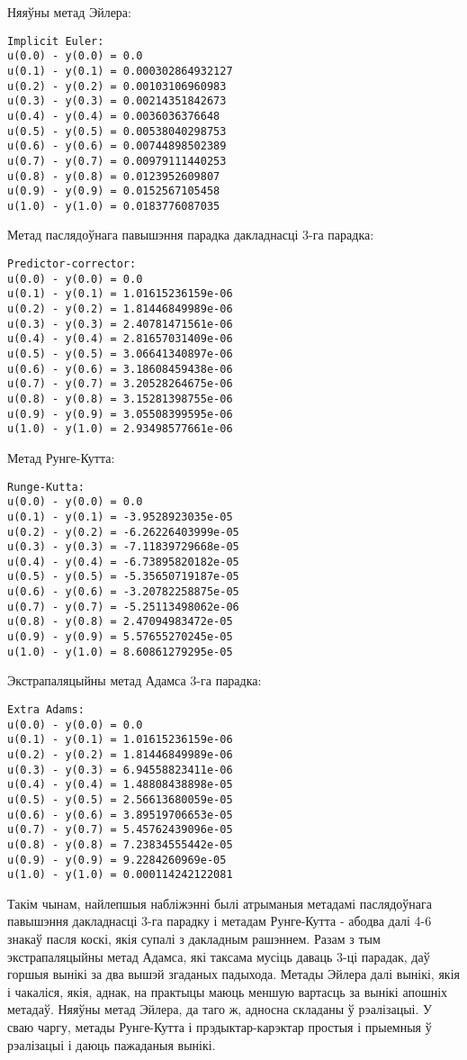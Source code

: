 Няяўны метад Эйлера:
{\small
\begin{verbatim}
Implicit Euler:
u(0.0) - y(0.0) = 0.0
u(0.1) - y(0.1) = 0.000302864932127
u(0.2) - y(0.2) = 0.00103106960983
u(0.3) - y(0.3) = 0.00214351842673
u(0.4) - y(0.4) = 0.0036036376648
u(0.5) - y(0.5) = 0.00538040298753
u(0.6) - y(0.6) = 0.00744898502389
u(0.7) - y(0.7) = 0.00979111440253
u(0.8) - y(0.8) = 0.0123952609807
u(0.9) - y(0.9) = 0.0152567105458
u(1.0) - y(1.0) = 0.0183776087035
\end{verbatim}
}

Метад паслядоўнага павышэння парадка дакладнасці 3-га парадка:
{\small
\begin{verbatim}
Predictor-corrector:
u(0.0) - y(0.0) = 0.0
u(0.1) - y(0.1) = 1.01615236159e-06
u(0.2) - y(0.2) = 1.81446849989e-06
u(0.3) - y(0.3) = 2.40781471561e-06
u(0.4) - y(0.4) = 2.81657031409e-06
u(0.5) - y(0.5) = 3.06641340897e-06
u(0.6) - y(0.6) = 3.18608459438e-06
u(0.7) - y(0.7) = 3.20528264675e-06
u(0.8) - y(0.8) = 3.15281398755e-06
u(0.9) - y(0.9) = 3.05508399595e-06
u(1.0) - y(1.0) = 2.93498577661e-06
\end{verbatim}
}

Метад Рунге-Кутта:
{\small
\begin{verbatim}
Runge-Kutta:
u(0.0) - y(0.0) = 0.0
u(0.1) - y(0.1) = -3.9528923035e-05
u(0.2) - y(0.2) = -6.26226403999e-05
u(0.3) - y(0.3) = -7.11839729668e-05
u(0.4) - y(0.4) = -6.73895820182e-05
u(0.5) - y(0.5) = -5.35650719187e-05
u(0.6) - y(0.6) = -3.20782258875e-05
u(0.7) - y(0.7) = -5.25113498062e-06
u(0.8) - y(0.8) = 2.47094983472e-05
u(0.9) - y(0.9) = 5.57655270245e-05
u(1.0) - y(1.0) = 8.60861279295e-05
\end{verbatim}
}

Экстрапаляцыйны метад Адамса 3-га парадка:
{\small
\begin{verbatim}
Extra Adams:
u(0.0) - y(0.0) = 0.0
u(0.1) - y(0.1) = 1.01615236159e-06
u(0.2) - y(0.2) = 1.81446849989e-06
u(0.3) - y(0.3) = 6.94558823411e-06
u(0.4) - y(0.4) = 1.48808438898e-05
u(0.5) - y(0.5) = 2.56613680059e-05
u(0.6) - y(0.6) = 3.89519706653e-05
u(0.7) - y(0.7) = 5.45762439096e-05
u(0.8) - y(0.8) = 7.23834555442e-05
u(0.9) - y(0.9) = 9.2284260969e-05
u(1.0) - y(1.0) = 0.000114242122081
\end{verbatim}
}

Такім чынам, найлепшыя набліжэнні былі атрыманыя метадамі паслядоўнага павышэння дакладнасці 3-га парадку і метадам Рунге-Кутта - абодва далі 4-6 знакаў пасля коскі, якія супалі з дакладным рашэннем. Разам з тым экстрапаляцыйны метад Адамса, які таксама мусіць даваць 3-ці парадак, даў горшыя вынікі за два вышэй згаданых падыхода. Метады Эйлера далі вынікі, якія і чакаліся, якія, аднак, на практыцы маюць меншую вартасць за вынікі апошніх метадаў. Няяўны метад Эйлера, да таго ж, адносна складаны ў рэалізацыі. У сваю чаргу, метады Рунге-Кутта і прэдыктар-карэктар простыя і прыемныя ў рэалізацыі і даюць пажаданыя вынікі.

